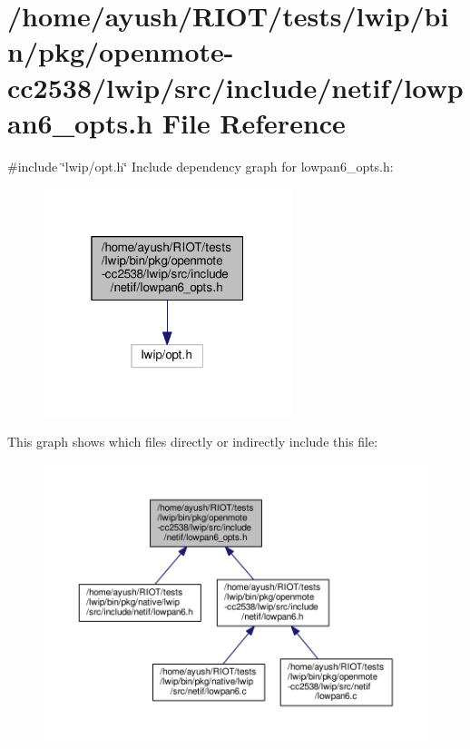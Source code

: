 \hypertarget{openmote-cc2538_2lwip_2src_2include_2netif_2lowpan6__opts_8h}{}\section{/home/ayush/\+R\+I\+O\+T/tests/lwip/bin/pkg/openmote-\/cc2538/lwip/src/include/netif/lowpan6\+\_\+opts.h File Reference}
\label{openmote-cc2538_2lwip_2src_2include_2netif_2lowpan6__opts_8h}
{\ttfamily \#include \char`\"{}lwip/opt.\+h\char`\"{}}\newline
Include dependency graph for lowpan6\+\_\+opts.\+h\+:
\nopagebreak
\begin{figure}[H]
\begin{center}
\leavevmode
\includegraphics[width=205pt]{openmote-cc2538_2lwip_2src_2include_2netif_2lowpan6__opts_8h__incl}
\end{center}
\end{figure}
This graph shows which files directly or indirectly include this file\+:
\nopagebreak
\begin{figure}[H]
\begin{center}
\leavevmode
\includegraphics[width=350pt]{openmote-cc2538_2lwip_2src_2include_2netif_2lowpan6__opts_8h__dep__incl}
\end{center}
\end{figure}

